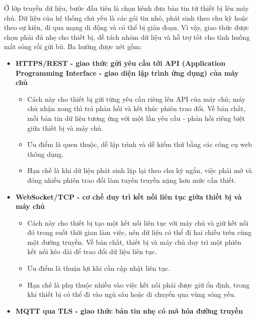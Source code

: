\documentclass[a4paper]{extarticle}
\providecommand{\tightlist}{%
  \setlength{\itemsep}{0pt}\setlength{\parskip}{0pt}}
\begin{document}
Ở lớp truyền dữ liệu, bước đầu tiên là chọn kênh đưa bản tin từ thiết bị lên máy chủ. Dữ liệu của hệ thống chủ yếu là các gói tin nhỏ, phát sinh theo chu kỳ hoặc theo sự kiện, đi qua mạng di động và có thể bị gián đoạn. Vì vậy, giao thức được chọn phải đủ nhẹ cho thiết bị, dễ tách nhóm dữ liệu và hỗ trợ tốt cho tình huống mất sóng rồi gửi bù. Ba hướng được xét gồm:

\begin{itemize}
\tightlist
\item
  \textbf{HTTPS/REST - giao thức gửi yêu cầu tới API (Application Programming Interface - giao diện lập trình ứng dụng) của máy chủ}

  \begin{itemize}
  \tightlist
  \item
    Cách này cho thiết bị gửi từng yêu cầu riêng lên API của máy chủ; máy chủ nhận xong thì trả phản hồi và kết thúc phiên trao đổi. Về bản chất, mỗi bản tin dữ liệu tương ứng với một lần yêu cầu - phản hồi riêng biệt giữa thiết bị và máy chủ.
  \item
    Ưu điểm là quen thuộc, dễ lập trình và dễ kiểm thử bằng các công cụ web thông dụng.
  \item
    Hạn chế là khi dữ liệu phát sinh lặp lại theo chu kỳ ngắn, việc phải mở và đóng nhiều phiên trao đổi làm tuyến truyền nặng hơn mức cần thiết.
  \end{itemize}
\item
  \textbf{WebSocket/TCP - cơ chế duy trì kết nối liên tục giữa thiết bị và máy chủ}

  \begin{itemize}
  \tightlist
  \item
    Cách này cho thiết bị tạo một kết nối liên tục với máy chủ và giữ kết nối đó trong suốt thời gian làm việc, nên dữ liệu có thể đi hai chiều trên cùng một đường truyền. Về bản chất, thiết bị và máy chủ duy trì một phiên kết nối kéo dài để trao đổi dữ liệu liên tục.
  \item
    Ưu điểm là thuận lợi khi cần cập nhật liên tục.
  \item
    Hạn chế là phụ thuộc nhiều vào việc kết nối phải được giữ ổn định, trong khi thiết bị có thể đi vào ngủ sâu hoặc di chuyển qua vùng sóng yếu.
  \end{itemize}
\item
  \textbf{MQTT qua TLS - giao thức bản tin nhẹ có mã hóa đường truyền}


\end{itemize}
\end{document}
